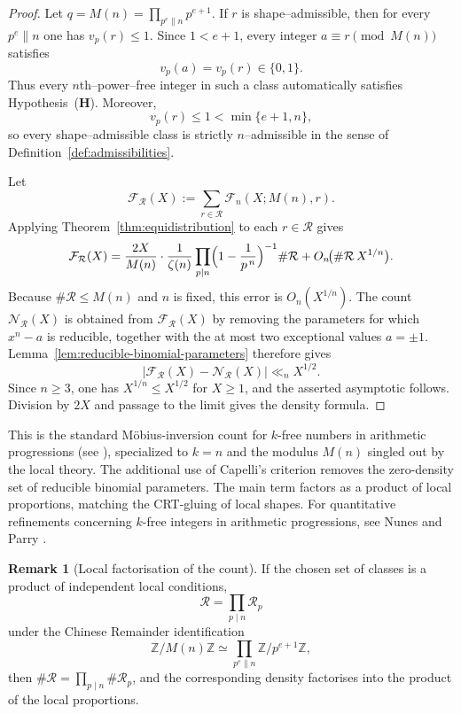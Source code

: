 \documentclass[12pt,a4paper,oneside]{amsart}
\theoremstyle{definition}
\newtheorem{remark}[theorem]{Remark}
\begin{document}
\begin{proof}
Let $q=M(n)=\prod_{p^e\parallel n}p^{e+1}$. If $r$ is shape--admissible, then for every $p^e\parallel n$ one has $v_p(r)\le1$. Since $1<e+1$, every integer $a\equiv r\pmod{M(n)}$ satisfies
\[
v_p(a)=v_p(r)\in\{0,1\}.
\]
Thus every $n$th--power--free integer in such a class automatically satisfies Hypothesis~\textup{(\textbf{H})}. Moreover,
\[
v_p(r)\le1<\min\{e+1,n\},
\]
so every shape--admissible class is strictly $n$--admissible in the sense of Definition~\ref{def:admissibilities}.

Let
\[
\mathcal F_\mathcal R(X):=
\sum_{r\in\mathcal R}\mathcal F_n(X;M(n),r).
\]
Applying Theorem~\ref{thm:equidistribution} to each $r\in\mathcal R$ gives
\[
\mathcal F_\mathcal R(X)
=
\frac{2X}{M(n)}\cdot\frac{1}{\zeta(n)}
\prod_{p\mid n}\Bigl(1-\frac1{p^{\,n}}\Bigr)^{-1}
\#\mathcal R
+O_n\!\bigl(\#\mathcal R\,X^{1/n}\bigr).
\]
Because $\#\mathcal R\le M(n)$ and $n$ is fixed, this error is $O_n(X^{1/n})$. The count $\mathcal N_\mathcal R(X)$ is obtained from $\mathcal F_\mathcal R(X)$ by removing the parameters for which $x^n-a$ is reducible, together with the at most two exceptional values $a=\pm1$. Lemma~\ref{lem:reducible-binomial-parameters} therefore gives
\[
\bigl|\mathcal F_\mathcal R(X)-\mathcal N_\mathcal R(X)\bigr|
\ll_n X^{1/2}.
\]
Since $n\ge3$, one has $X^{1/n}\le X^{1/2}$ for $X\ge1$, and the asserted asymptotic follows. Division by $2X$ and passage to the limit gives the density formula.
\end{proof}

This is the standard Möbius-inversion count for $k$-free numbers in arithmetic progressions (see \cite{Ten15}), specialized to $k=n$ and the modulus $M(n)$ singled out by the local theory. The additional use of Capelli's criterion removes the zero-density set of reducible binomial parameters. The main term factors as a product of local proportions, matching the CRT-gluing of local shapes. For quantitative refinements concerning $k$-free integers in arithmetic progressions, see Nunes \cite{Nun22} and Parry \cite{Par21}.

\begin{remark}[Local factorisation of the count]\label{rem:local-count}
If the chosen set of classes is a product of independent local conditions,
\[
\mathcal R=\prod_{p\mid n}\mathcal R_p
\]
under the Chinese Remainder identification
\[
\mathbb Z/M(n)\mathbb Z\simeq
\prod_{p^e\parallel n}\mathbb Z/p^{e+1}\mathbb Z,
\]
then \(\#\mathcal R=\prod_{p\mid n}\#\mathcal R_p\), and the corresponding
density factorises into the product of the local proportions.
\end{remark}
\end{document}
